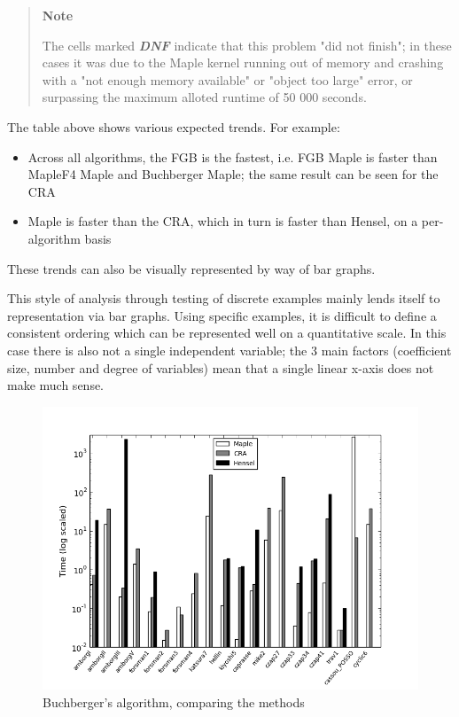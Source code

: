 \documentclass[letterpaper,12pt,titlepage,oneside,final]{book}
\newenvironment{note}{\begin{quote}%
  \textbf{Note }%
  \quad
}{%
\end{quote}%
}
\begin{document}
\newpage 

\begin{note}
  The cells marked \textit{\textbf{DNF}} indicate that this problem "did not finish"; in these cases it was due to the Maple kernel running out of memory and crashing with a "not enough memory available" or "object too large" error, or surpassing the maximum alloted runtime of 50 000 seconds.  
\end{note}

The table above shows various expected trends.  For example:

\begin{itemize}
  \item Across all algorithms, the FGB is the fastest, i.e. FGB Maple is faster than MapleF4 Maple and Buchberger Maple; the same result can be seen for the CRA
  \item  Maple is faster than the CRA, which in turn is faster than Hensel, on a per-algorithm basis
\end{itemize}

These trends can also be visually represented by way of bar graphs.

This style of analysis through testing of discrete examples mainly lends itself to representation via bar graphs.  Using specific examples, it is difficult to define a consistent ordering which can be represented well on a quantitative scale.  In this case there is also not a single independent variable; the 3 main factors (coefficient size, number and degree of variables) mean that a single linear x-axis does not make much sense.

\begin{figure}[H]
  \centering
  \includegraphics[scale=0.7]{bb_tests.png}
  \caption{Buchberger's algorithm, comparing the methods \label{fig:bb_tests}}
\end{figure}
\end{document}
